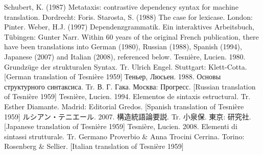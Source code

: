 Schubert, K. (1987) Metataxis: contrastive dependency syntax for machine translation. Dordrecht: Foris.
Starosta, S. (1988) The case for lexicase. London: Pinter.
Weber, H.J. (1997) Dependenzgrammatik. Ein interaktives Arbeitsbuch, Tübingen: Gunter Narr.
%
Within 60 years of the original French publication, there have been translations into German (1980), Russian (1988), Spanish (1994), Japanese (2007) and Italian (2008), referenced below.
%
Tesnière, Lucien. 1980. Grundzüge der strukturalen Syntax. Tr. Ulrich Engel. Stuttgart: Klett-Cotta. [German translation of Tesnière 1959]
Теньер, Люсьен. 1988. Основы структурного синтаксиса. Tr.  В. Г. Гака. Москва: Прогресс. [Russian translation of Tesnière 1959]
Tesnière, Lucien. 1994. Elementos de sintaxis estructural. Tr. Esther Diamante. Madrid: Editorial Gredos. [Spanish translation of Tesnière 1959]
ルシアン・テニエール. 2007. 構造統語論要説. Tr. 小泉保. 東京: 研究社. [Japanese translation of Tesnière 1959]
Tesnière, Lucien. 2008. Elementi di sintassi strutturale. Tr. Germano Proverbio & Anna Trocini Cerrina. Torino: Rosenberg & Sellier. [Italian translation of Tesnière 1959]
%
\fi
%
